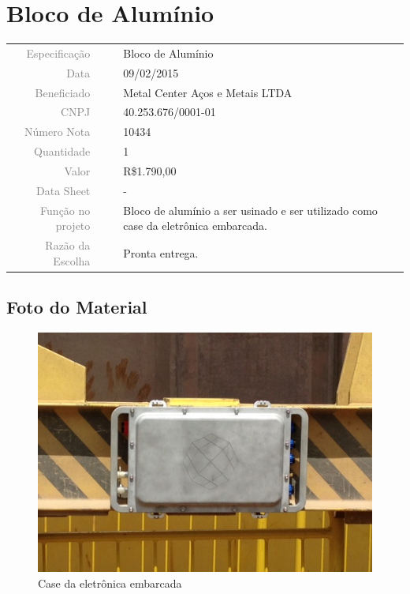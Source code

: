 \section{Bloco de Alumínio}
\label{aluminio_01}


\begin{table}[ht!]

	\begin{tabular}{r l|l p{12cm} }
		
		\textcolor{gray}{Especificação} &&& 	{Bloco de Alumínio}\\
		\textcolor{gray}{Data} &&& 				{09/02/2015}\\
        \textcolor{gray}{Beneficiado} &&&		{Metal Center Aços e Metais LTDA}\\
        \textcolor{gray}{CNPJ} &&& 				{40.253.676/0001-01}\\
        \textcolor{gray}{Número Nota} &&& 		{10434}\\
		\textcolor{gray}{Quantidade} &&& 		{1}\\
		\textcolor{gray}{Valor} &&& 			{R\$1.790,00}\\
		\textcolor{gray}{Data Sheet} &&& 		{-}\\

		\textcolor{gray}{Função no projeto} &&& {Bloco de alumínio a ser
		usinado e ser utilizado como case da eletrônica embarcada.}\\
		\textcolor{gray}{Razão da Escolha} &&& {Pronta entrega.}

	\end{tabular}
\end{table}

\newpage
\subsection{Foto do Material}
\begin{figure}[H]
 \centering
 \includegraphics[width=1\columnwidth]{Aluminio/foto.png}
 \caption{Case da eletrônica embarcada}
\end{figure}

